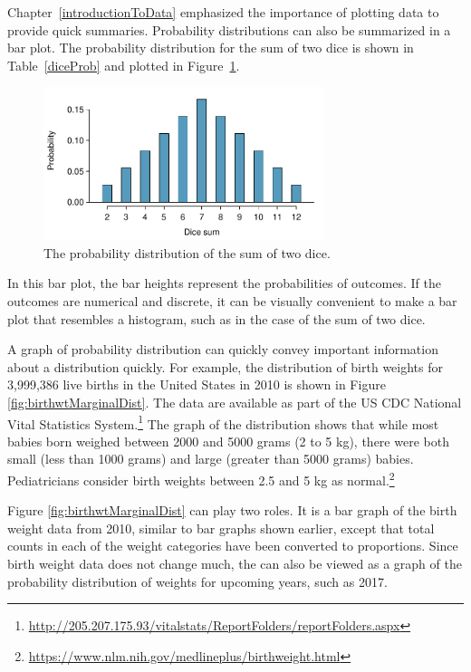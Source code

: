 Chapter~\ref{introductionToData} emphasized the importance of plotting data to provide quick summaries. Probability distributions can also be summarized in a bar plot. The probability distribution for the sum of two dice is shown in Table~\ref{diceProb} and plotted in Figure~\ref{diceSumDist}.

\begin{figure}[h]
\centering
\includegraphics[width=0.73\textwidth]{ch_probability_oi_biostat/figures/diceSumDist/diceSumDist}
\caption{The probability distribution of the sum of two dice.}
\label{diceSumDist}
\end{figure}

In this bar plot, the bar heights represent the probabilities of outcomes. If the outcomes are numerical and discrete, it can be visually convenient to make a bar plot that resembles a histogram, such as in the case of the sum of two dice.  

A graph of probability distribution can quickly convey important information about a distribution quickly. For example, the distribution of birth weights for 3,999,386 live births in the United States in 2010 is shown in Figure \ref{fig:birthwtMarginalDist}.  The data are available as part of the US CDC National Vital Statistics System.\footnote{\url{http://205.207.175.93/vitalstats/ReportFolders/reportFolders.aspx}} The graph of the distribution shows that while most babies born weighed between 2000 and 5000 grams (2 to 5 kg), there were both small (less than 1000 grams) and large (greater than 5000 grams) babies. Pediatricians consider birth weights between 2.5 and 5 kg as normal.\footnote{\url{https://www.nlm.nih.gov/medlineplus/birthweight.html}}

Figure \ref{fig:birthwtMarginalDist} can play two roles.  It is a bar graph of the birth weight data from 2010, similar to bar graphs shown earlier, except that total counts in each of the weight categories have been converted to proportions.  Since birth weight data does not change much, the can also be viewed as a graph of the probability distribution of weights for upcoming years, such as 2017.



